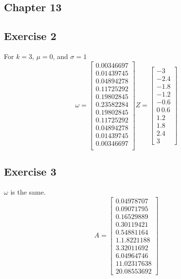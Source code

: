 \documentclass[letterpaper,12pt]{article}
\theoremstyle{definition}
\begin{document}
\subsection*{Chapter 13}
\subsection*{Exercise 2}

For $k = 3$, $\mu = 0$, and $\sigma = 1$
\[
\omega = 
\begin{bmatrix}
    0.00346697\\  0.01439745\\  0.04894278 \\ 0.11725292 \\ 0.19802845\\  0.23582284\\
  0.19802845 \\ 0.11725292 \\ 0.04894278  \\0.01439745 \\ 0.00346697\\
    
\end{bmatrix}
Z = \begin{bmatrix}
    -3\\ -2.4\\ -1.8 \\-1.2 \\-0.6\\  0\   0.6\\  1.2 \\ 1.8  \\2.4\\  3\
\end{bmatrix}
\]

\subsection*{Exercise 3}
$\omega$ is the same.
\[
A = \begin{bmatrix}
0.04978707\\ 0.09071795\\ 0.16529889\\ 0.30119421\\ 0.54881164\\ 1. 1.8221188\\3.32011692\\ 6.04964746\\11.02317638\\20.08553692
\end{bmatrix}
\]
\end{document}
